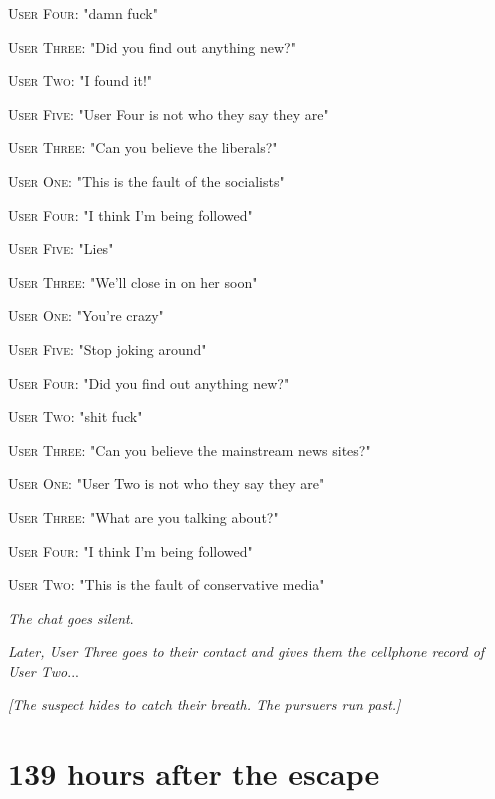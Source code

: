\documentclass{report}
\begin{document}
\textsc{User Four}: "damn fuck" 

\textsc{User Three}: "Did you find out anything new?" 

\textsc{User Two}: "I found it!" 

\textsc{User Five}: "User Four is not who they say they are" 

\textsc{User Three}: "Can you believe the liberals?" 

\textsc{User One}: "This is the fault of the socialists" 

\textsc{User Four}: "I think I'm being followed" 

\textsc{User Five}: "Lies" 

\textsc{User Three}: "We'll close in on her soon" 

\textsc{User One}: "You're crazy" 

\textsc{User Five}: "Stop joking around" 

\textsc{User Four}: "Did you find out anything new?" 

\textsc{User Two}: "shit fuck" 

\textsc{User Three}: "Can you believe the mainstream news sites?" 

\textsc{User One}: "User Two is not who they say they are" 

\textsc{User Three}: "What are you talking about?" 

\textsc{User Four}: "I think I'm being followed" 

\textsc{User Two}: "This is the fault of conservative media" 

\textit{The chat goes silent}. 

\textit{Later, User Three goes to their contact and gives them the cellphone record of User Two}...

\textit{[The suspect hides to catch their breath. The pursuers run past.]}


\section*{139 \small{hours after the escape}}
\end{document}

